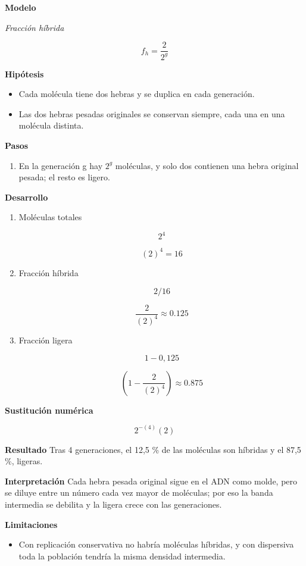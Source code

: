 \documentclass{book}
\begin{document}
\noindent\textbf{Modelo}

\noindent\textit{Fracción híbrida}

\[
f_h = \frac{2}{2^{g}}
\]

\noindent\textbf{Hipótesis}
\begin{itemize}
\item Cada molécula tiene dos hebras y se duplica en cada generación.
\item Las dos hebras pesadas originales se conservan siempre, cada una en una molécula distinta.
\end{itemize}

\noindent\textbf{Pasos}
\begin{enumerate}
\item
En la generación g hay \(2^g\) moléculas, y solo dos contienen una hebra original pesada; el resto es ligero.

\end{enumerate}

\noindent\textbf{Desarrollo}
\begin{enumerate}
\item
Moléculas totales


\[
2^4
\]

\[
\left(2\right)^{4} = 16
\]
\item
Fracción híbrida


\[
2/16
\]

\[
\frac{2}{\left(2\right)^{4}} \approx 0.125
\]
\item
Fracción ligera


\[
1 - 0{,}125
\]

\[
\left(1-\frac{2}{\left(2\right)^{4}}\right) \approx 0.875
\]
\end{enumerate}

\noindent\textbf{Sustitución numérica}

\[
2^{- \left(4\right)} \left(2\right)
\]

\noindent\textbf{Resultado}
Tras 4 generaciones, el 12,5 \% de las moléculas son híbridas y el 87,5 \%, ligeras.


\noindent\textbf{Interpretación}
Cada hebra pesada original sigue en el ADN como molde, pero se diluye entre un número cada vez mayor de moléculas; por eso la banda intermedia se debilita y la ligera crece con las generaciones.


\noindent\textbf{Limitaciones}
\begin{itemize}
\item Con replicación conservativa no habría moléculas híbridas, y con dispersiva toda la población tendría la misma densidad intermedia.
\end{itemize}
\end{document}
